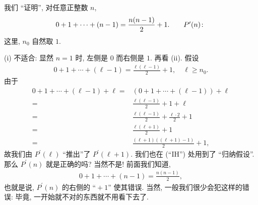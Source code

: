 \begin{example}
    我们 ``证明'', 对任意正整数 $n$,
    \begin{align*}
        0 + 1 + \cdots + (n - 1) = \frac{n(n-1)}{2} + 1. \tag*{$P^{\prime}(n) \colon$}
    \end{align*}
    这里, $n_0$ 自然取 $1$.

    (i) 不适合: 显然 $n=1$ 时, 左侧是 $0$ 而右侧是 $1$. 再看 (ii). 假设
    \begin{align*}
        0 + 1 + \cdots + (\ell - 1) = \frac{\ell(\ell-1)}{2} + 1, \quad \ell \geq n_0.
    \end{align*}
    由于
    \begin{align*}
        0 + 1 + \cdots + (\ell - 1) + \ell
        = {} & (0 + 1 + \cdots + (\ell - 1)) + \ell                \\
        = {} & \frac{\ell(\ell-1)}{2} + 1 + \ell \tag*{(``IH'')}   \\
        = {} & \frac{\ell(\ell-1)}{2} + \frac{\ell \cdot 2}{2} + 1 \\
        = {} & \frac{\ell(\ell+1)}{2} + 1                          \\
        = {} & \frac{(\ell+1)((\ell+1) - 1)}{2} + 1,
    \end{align*}
    故我们由 $P^{\prime}(\ell)$ ``推出''了 $P^{\prime}(\ell + 1)$. 我们也在 (``IH'') 处用到了 ``归纳假设''. 那么 $P^{\prime}(n)$ 就是正确的吗? 当然不是! 前面我们知道,
    \begin{align*}
        0 + 1 + \cdots + (n - 1) = \frac{n(n-1)}{2},
    \end{align*}
    也就是说, $P^{\prime}(n)$ 的右侧的 ``${} + 1$'' 使其错误. 当然, 一般我们很少会犯这样的错误: 毕竟, 一开始就不对的东西就不用看下去了.
\end{example}

